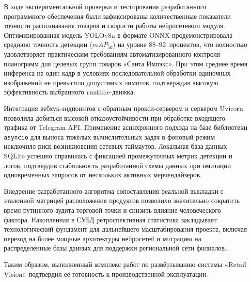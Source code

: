{\gostFont

	\par \redline В ходе экспериментальной проверки и тестирования разработанного программного обеспечения были зафиксированы количественные показатели точности распознавания товаров и скорости работы нейросетевого модуля.
	Оптимизированная модель YOLOv8n в формате ONNX продемонстрировала среднюю точность детекции ($mAP_{50}$) на уровне 88–92~процентов, что полностью удовлетворяет практическим требованиям автоматизированного контроля планограмм для целевых групп товаров «Санта Импэкс».
	При этом среднее время инференса на один кадр в условиях последовательной обработки одиночных изображений не превысило допустимых лимитов, подтверждая высокую эффективность выбранного runtime-движка.\par \redline Интеграция вебхук-эндпоинтов с обратным прокси-сервером и сервером Uvicorn позволила добиться высокой отказоустойчивости при обработке входящего трафика от Telegram API.
	Применение асинхронного подхода на базе библиотеки \texttt{asyncio} для выноса тяжёлых вычислительных задач в фоновый режим исключило риск возникновения сетевых таймаутов.
	Локальная база данных SQLite успешно справилась с фиксацией промежуточных метрик детекции и логов, подтвердив стабильность разработанной схемы данных при имитации одновременных запросов от нескольких активных мерчендайзеров.\par \redline Внедрение разработанного алгоритма сопоставления реальной выкладки с эталонной матрицей расположения продуктов позволило значительно сократить время рутинного аудита торговой точки и снизить влияние человеческого фактора.
	Накопленная в СУБД ретроспективная статистика закладывает технологический фундамент для дальнейшего масштабирования проекта, включая переход на более мощные архитектуры нейросетей и миграцию на распределённые базы данных для поддержки региональной сети филиалов.\par \redline Таким образом, выполненный комплекс работ по развёртыванию системы «Retail Vision» подтвердил её готовность к производственной эксплуатации.
	\par
}

\setcounter{subchaptercntr}{1}
\setcounter{formulacntr}{1}
\setcounter{imagecntr}{1}
\setcounter{tablecntr}{1}
\setcounter{itemcntr}{1}